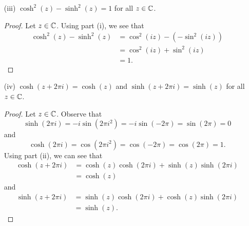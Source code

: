 \documentclass[a4paper]{article}
\begin{document}
\begin{enumerate}
\begin{proof}
\begin{align*}
                           &= \cos(iz + iw) \\
                           &= \cos(iz)\cos(iw) - \sin(iz) \sin(iw) \\
                           &= \cosh(z)\cosh(w) + i^{2} \sin(iz) \sin(iw) \\
                           &= \cosh(z) \cosh(w) + (-i \sin(iz))(-i \sin(iw)) \\
                           &= \cosh(z) \cosh(w) + \sinh(z) \sinh(w).
            \end{align*}
        \end{proof}
    \item[(iii)] \( \cosh^{2}(z) - \sinh^{2}(z) = 1 \) for all \( z \in \mathbb{C}  \). 
        \begin{proof}
        Let \( z \in \mathbb{C}  \). Using part (i), we see that
        \begin{align*}
            \cosh^{2}(z) - \sinh^{2}(z) &= \cos^{2}(iz) - (- \sin^{2}(iz)) \\
                                        &= \cos^{2}(iz) + \sin^{2}(iz) \\ 
                                        &= 1.
        \end{align*}
        \end{proof}
    \item[(iv)] \( \cosh(z + 2 \pi i ) = \cosh(z) \) and \( \sinh(z + 2 \pi i ) = \sinh(z) \) for all \( z \in \mathbb{C}  \).
        \begin{proof}
        Let \( z \in \mathbb{C}  \). Observe that
        \[  \sinh(2\pi i) = -i \sin(2\pi i^{2}) = -i \sin(-2\pi) = \sin(2\pi) = 0 \]
        and 
        \[  \cosh(2\pi i ) = \cos(2\pi i^{2}) = \cos(-2 \pi) = \cos(2\pi) = 1. \]
        Using part (ii), we can see that
        \begin{align*}
            \cosh(z+2\pi i) &= \cosh(z) \cosh(2\pi i) + \sinh(z) \sinh(2\pi i )   \\
                            &= \cosh(z)
        \end{align*}
        and
        \begin{align*}
            \sinh(z + 2\pi i) &= \sinh(z)\cosh(2 \pi i) + \cosh(z) \sinh(2 \pi i) \\
                              &= \sinh(z).
        \end{align*}


\end{proof}
\end{enumerate}
\end{document}
